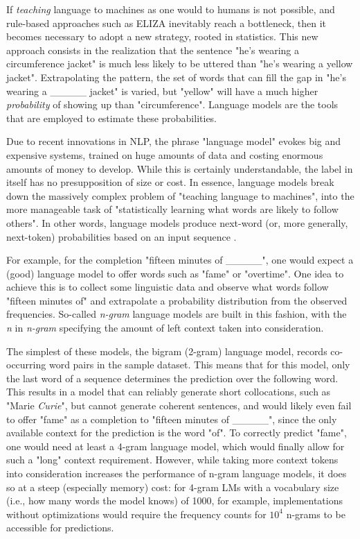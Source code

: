 If \emph{teaching} language to machines as one would to humans is not possible, and rule-based approaches such as ELIZA inevitably reach a bottleneck, then it becomes necessary to adopt a new strategy, rooted in statistics. This new approach consists in the realization that the sentence "he's wearing a circumference jacket" is much less likely to be uttered than "he's wearing a yellow jacket". Extrapolating the pattern, the set of words that can fill the gap in "he's wearing a \_\_\_\_\_ jacket" is varied, but "yellow" will have a much higher \emph{probability} of showing up than "circumference". Language models are the tools that are employed to estimate these probabilities.

Due to recent innovations in NLP, the phrase "language model" evokes big and expensive systems, trained on huge amounts of data and costing enormous amounts of money to develop. While this is certainly understandable, the label in itself has no presupposition of size or cost. In essence, language models break down the massively complex problem of "teaching language to machines", into the more manageable task of "statistically learning what words are likely to follow others". In other words, language models produce next-word (or, more generally, next-token) probabilities based on an input sequence \citep{citationneeded}.

For example, for the completion "fifteen minutes of \_\_\_\_\_", one would expect a (good) language model to offer words such as "fame" or "overtime". One idea to achieve this is to collect some linguistic data and observe what words follow "fifteen minutes of" and extrapolate a probability distribution from the observed frequencies. So-called \emph{n-gram} language models \citep{citationneeded} are built in this fashion, with the \emph{n} in \emph{n-gram} specifying the amount of left context taken into consideration.

The simplest of these models, the bigram (2-gram) language model, records co-occurring word pairs in the sample dataset. This means that for this model, only the last word of a sequence determines the prediction over the following word. This results in a model that can reliably generate short collocations, such as "Marie \emph{Curie}", but cannot generate coherent sentences, and would likely even fail to offer "fame" as a completion to "fifteen minutes of \_\_\_\_\_", since the only available context for the prediction is the word "of". To correctly predict "fame", one would need at least a 4-gram language model, which would finally allow for such a "long" context requirement. However, while taking more context tokens into consideration increases the performance of n-gram language models, it does so at a steep (especially memory) cost: for 4-gram LMs with a vocabulary size (i.e., how many words the model knows) of 1000, for example, implementations without optimizations would require the frequency counts for $10^{4}$ n-grams to be accessible for predictions.

